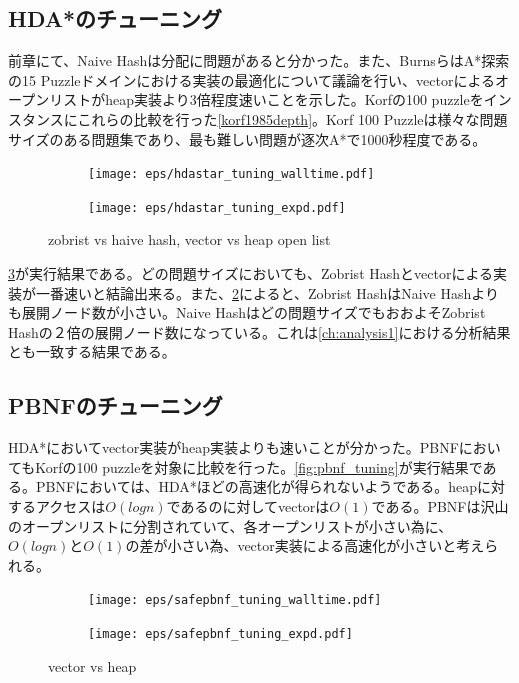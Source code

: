 \documentclass{jsarticle}
\begin{document}
\subsection{HDA*のチューニング}
\label{sec:hdastar_tuning}

前章にて、Naive Hashは分配に問題があると分かった。また、BurnsらはA*探索の15 Puzzleドメインにおける実装の最適化について議論を行い、vectorによるオープンリストがheap実装より3倍程度速いことを示した\cite{burns2012implementing}。Korfの100 puzzleをインスタンスにこれらの比較を行った\ref{korf1985depth}。Korf 100 Puzzleは様々な問題サイズのある問題集であり、最も難しい問題が逐次A*で1000秒程度である。

\begin{figure}
	\centering
	\begin{subfigure}{0.4\columnwidth}
		\texttt{[image: eps/hdastar\_tuning\_walltime.pdf]}
		\label{fig:hdastar_tuning_walltime}
	\end{subfigure}
	\begin{subfigure}{0.4\columnwidth}
		\texttt{[image: eps/hdastar\_tuning\_expd.pdf]}
		\label{fig:hdastar_tuning_expd}
	\end{subfigure}
	\label{fig:hdastar_tuning}
	\caption{zobrist vs haive hash, vector vs heap open list}
\end{figure}

\ref{fig:hdastar_tuning}が実行結果である。どの問題サイズにおいても、Zobrist Hashとvectorによる実装が一番速いと結論出来る。また、\ref{fig:hdastar_tuning_expd}によると、Zobrist HashはNaive Hashよりも展開ノード数が小さい。Naive Hashはどの問題サイズでもおおよそZobrist Hashの２倍の展開ノード数になっている。これは\ref{ch:analysis1}における分析結果とも一致する結果である。


\subsection{PBNFのチューニング}
\label{sec:pbnf_tuning}

HDA*においてvector実装がheap実装よりも速いことが分かった。PBNFにおいてもKorfの100 puzzleを対象に比較を行った。\ref{fig:pbnf_tuning}が実行結果である。PBNFにおいては、HDA*ほどの高速化が得られないようである。heapに対するアクセスは$O(logn)$であるのに対してvectorは$O(1)$である。PBNFは沢山のオープンリストに分割されていて、各オープンリストが小さい為に、$O(logn)$と$O(1)$の差が小さい為、vector実装による高速化が小さいと考えられる。


\begin{figure}
	\centering
	\begin{subfigure}{0.4\columnwidth}
		\texttt{[image: eps/safepbnf\_tuning\_walltime.pdf]}
		\label{fig:safepbnf_tuning_walltime}
	\end{subfigure}
	\begin{subfigure}{0.4\columnwidth}
		\texttt{[image: eps/safepbnf\_tuning\_expd.pdf]}
		\label{fig:safepbnf_tuning_expd}
	\end{subfigure}
	\label{fig:safepbnf_tuning}
	\caption{vector vs heap}
\end{figure}
\end{document}
